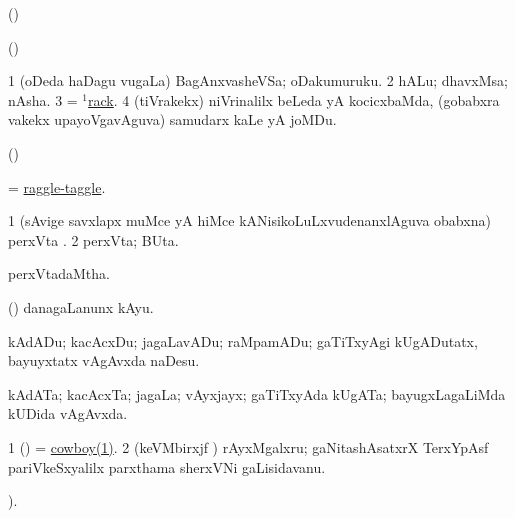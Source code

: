 \bentry
{} 
\gl{\saMkiSx}
\expl{}
\bmng
(\UK)  
\emng
\eentry

\bentry
{} 
\gl{\saMkiSx}
\expl{}
\bmng
{} 
\emng
\eentry

\bentry
{} 
\gl{\saMkiSx}
\expl{}
\bmng
(\UK)  
\emng
\eentry

\bentry
{} 
\gl{\nA}
\expl{}
\bmng
\bnum
\num{1} (oDeda haDagu \mo vugaLa) BagAnxvasheVSa; oDakumuruku. 
\num{2} hALu; dhavxMsa; nAsha. 
\num{3} = \hyperref{kandict_r.pdf}{R}{rack(1)}{$^1$rack}. 
\num{4} (tiVrakekx) niVrinalilx beLeda yA kocicxbaMda, (gobabxra \mo vakekx upayoVgavAguva) samudarx kaLe yA joMDu. 
\enum
\emng
\eentry

\bentry
{} 
\gl{\saMkiSx}
\expl{}
\bmng
(\UK)  
\emng
\eentry

\bentry
{} 
\gl{\gu}
\expl{}
\bmng
= \hyperref{kandict_r.pdf}{R}{raggle-taggle}{raggle-taggle}. 
\emng
\eentry

\bentry
{} 
\gl{\nA}
\expl{}
\bmng
\bnum
\num{1} (sAvige savxlapx muMce yA hiMce kANisikoLuLxvudenanxlAguva obabxna) perxVta \rUpa. 
\num{2} perxVta; BUta. 
\enum
\emng
\eentry

\bentry
{} 
\gl{\gu}
\expl{}
\bmng
perxVtadaMtha. 
\emng
\eentry

\bentry
{} 
\gl{\sakirx}
\bmng
(\ame) danagaLanunx kAyu. 
\emng

\noindent
\gl{\akirx}
\expl{}
\bmng
kAdADu; kacAcxDu; jagaLavADu; raMpamADu; gaTiTxyAgi kUgADutatx, bayuyxtatx vAgAvxda naDesu. 
\emng
\eentry

\bentry
{} 
\gl{\nA}
\expl{}
\bmng
kAdATa; kacAcxTa; jagaLa; vAyxjayx; gaTiTxyAda kUgATa; bayugxLagaLiMda kUDida vAgAvxda. 
\emng
\eentry

\bentry
{} 
\gl{\nA}
\expl{}
\bmng
\bnum
\num{1} (\ame) = \hyperref{kandict_c.pdf}{C}{cowboy(1)}{cowboy(1)}. 
\num{2} (keVMbirxjf \vivi) rAyxMgalxru; gaNitashAsatxrX TerxYpAsf  pariVkeSxyalilx parxthama sherxVNi gaLisidavanu. 
\enum
\emng
\eentry

\bentry
{} 
\gl{\kirx}
 ).

